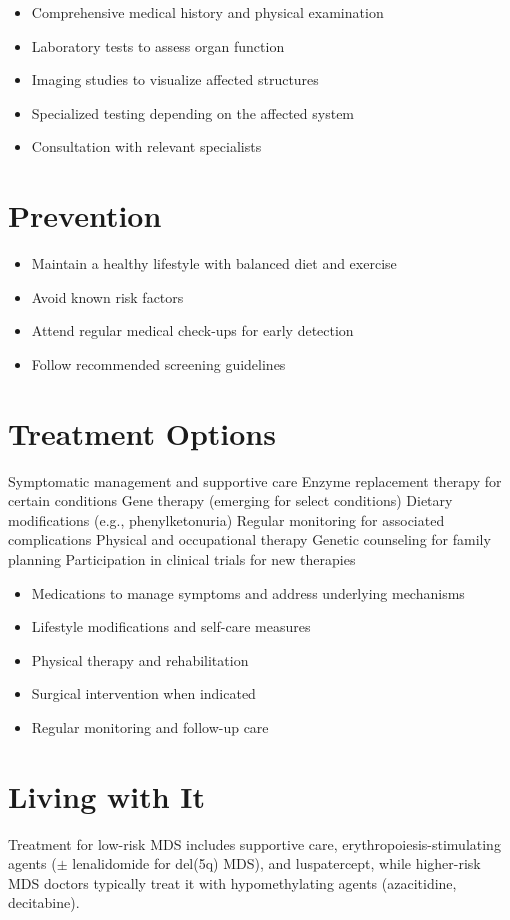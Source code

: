 \begin{itemize}[noitemsep]
  \item Comprehensive medical history and physical examination
  \item Laboratory tests to assess organ function
  \item Imaging studies to visualize affected structures
  \item Specialized testing depending on the affected system
  \item Consultation with relevant specialists
\end{itemize}
\section{Prevention}
\begin{itemize}[noitemsep]
  \item Maintain a healthy lifestyle with balanced diet and exercise
  \item Avoid known risk factors
  \item Attend regular medical check-ups for early detection
  \item Follow recommended screening guidelines
\end{itemize}
\section{Treatment Options}
Symptomatic management and supportive care Enzyme replacement therapy for certain conditions Gene therapy (emerging for select conditions) Dietary modifications (e.g., phenylketonuria) Regular monitoring for associated complications Physical and occupational therapy Genetic counseling for family planning Participation in clinical trials for new therapies

\begin{itemize}[noitemsep]
  \item Medications to manage symptoms and address underlying mechanisms
  \item Lifestyle modifications and self-care measures
  \item Physical therapy and rehabilitation
  \item Surgical intervention when indicated
  \item Regular monitoring and follow-up care
\end{itemize}
\section{Living with It}
Treatment for low-risk MDS includes supportive care, erythropoiesis-stimulating agents ($\pm$ lenalidomide for del(5q) MDS), and luspatercept, while higher-risk MDS doctors typically treat it with hypomethylating agents (azacitidine, decitabine).

